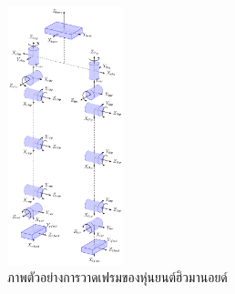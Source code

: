 \begin{figure}[!ht]
	\centering
	\includegraphics[width=0.3\textwidth]{chapter4/images/uthai_tools/uthai_kinematics.png}
	\caption{ภาพตัวอย่างการวาดเฟรมของหุ่นยนต์ฮิวมานอยด์}
	\label{fig:uthai_kinematics_sk}
\end{figure}